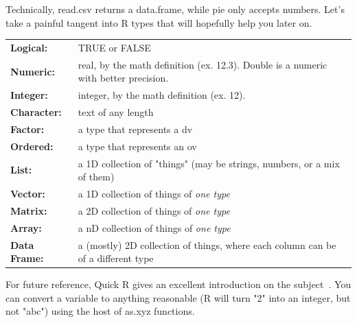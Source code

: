 \documentclass{report}
\newcommand{\code}[1]{\textsf{\ttfamily #1}}
\begin{document}
Technically, \code{read.csv} returns a \code{data.frame}, while \code{pie} only accepts numbers. Let's take a painful tangent into R types that will hopefully help you later on.

\begin{tcolorbox}[title=R types]
\begin{tabularx}{\textwidth}{>{\bfseries}l X}
Logical: & TRUE or FALSE\\[0.2cm]
Numeric: & real, by the math definition (ex. 12.3). Double is a numeric with better precision.\\[0.2cm]
Integer: & integer, by the math definition (ex. 12).\\[0.2cm]
Character: & text of any length\\[0.2cm]
Factor: & a type that represents a \gls{dv}\\[0.2cm]
Ordered: & a type that represents an \gls{ov}\\[0.2cm]
List: & a 1D collection of "things" (may be strings, numbers, or a mix of them)\\[0.2cm]
Vector: & a 1D collection of things of \emph{one type}\\[0.2cm]
Matrix: & a 2D collection of things of \emph{one type}\\[0.2cm]
Array: & a nD collection of things of \emph{one type}\\[0.2cm]
Data Frame: & a (mostly) 2D collection of things, where each column can be of a different type
\end{tabularx}
For future reference, Quick R gives an excellent introduction on the subject~\cite{quickr}. You can convert a variable to anything reasonable (R will turn "2" into an integer, but not "abc") using the host of \code{as.xyz} functions.
\end{tcolorbox}
\end{document}
